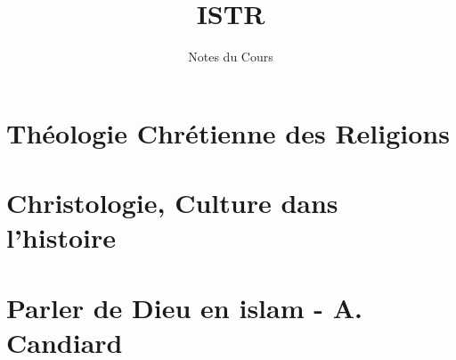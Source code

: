 \documentclass[oneside,10pt]{book} %
\title{ISTR}
\author{Notes du Cours}
\begin{document}


\maketitle



\setcounter{page}{1}
\begin{fullwidth}
\tableofcontents
\end{fullwidth}

\setcounter{page}{1}
 
\mainmatter
 

\part{Théologie Chrétienne des Religions}








\part{Christologie, Culture dans l'histoire}


 
 
 
 


 
 

 
 
 

  
 


%
%
\part{Parler de Dieu en islam - A. Candiard}
 
 
 
  
  
  
  
 
\end{document}
